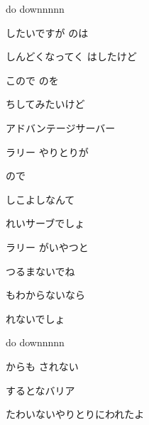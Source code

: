 \documentclass[a4paper,tate,twocolumn,12pt]{ltjtarticle}
\begin{document}
\begin{flushleft}
\noindent\begin{minipage}{\linewidth}
do downnnnn
\end{minipage}

\vspace{3em}

\noindent\begin{minipage}{\linewidth}
したいですが のは

しんどくなってく はしたけど

こので のを

ちしてみたいけど

アドバンテージサーバー
\end{minipage}

\vspace{2em}

\noindent\begin{minipage}{\linewidth}
ラリー やりとりが

ので

しこよしなんて

れいサーブでしょ

ラリー がいやつと

つるまないでね

もわからないなら

れないでしょ
\end{minipage}

\vspace{2em}

\noindent\begin{minipage}{\linewidth}
do downnnnn
\end{minipage}

\vspace{3em}

\noindent\begin{minipage}{\linewidth}
からも されない

 するとなバリア

たわいないやりとりにわれたよ


\end{minipage}
\end{flushleft}
\end{document}
